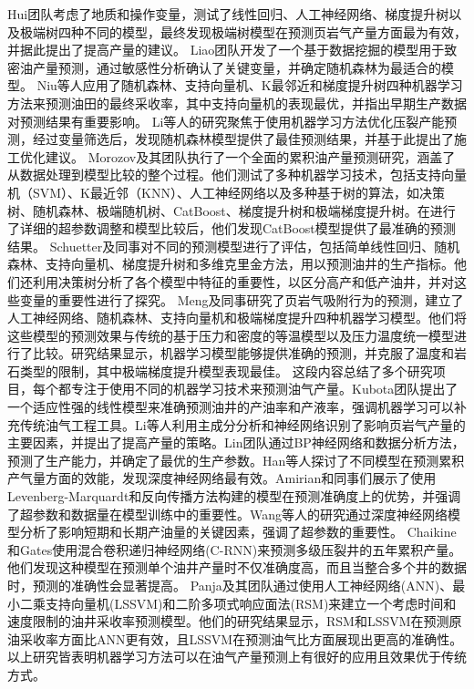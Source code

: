 Hui团队考虑了地质和操作变量，测试了线性回归、人工神经网络、梯度提升树以及极端树四种不同的模型，最终发现极端树模型在预测页岩气产量方面最为有效，并据此提出了提高产量的建议。
Liao团队开发了一个基于数据挖掘的模型用于致密油产量预测，通过敏感性分析确认了关键变量，并确定随机森林为最适合的模型。
Niu等人应用了随机森林、支持向量机、K最邻近和梯度提升树四种机器学习方法来预测油田的最终采收率，其中支持向量机的表现最优，并指出早期生产数据对预测结果有重要影响。
Li等人的研究聚焦于使用机器学习方法优化压裂产能预测，经过变量筛选后，发现随机森林模型提供了最佳预测结果，并基于此提出了施工优化建议。
Morozov及其团队执行了一个全面的累积油产量预测研究，涵盖了从数据处理到模型比较的整个过程。他们测试了多种机器学习技术，包括支持向量机（SVM）、K最近邻（KNN）、人工神经网络以及多种基于树的算法，如决策树、随机森林、极端随机树、CatBoost、梯度提升树和极端梯度提升树。在进行了详细的超参数调整和模型比较后，他们发现CatBoost模型提供了最准确的预测结果。
Schuetter及同事对不同的预测模型进行了评估，包括简单线性回归、随机森林、支持向量机、梯度提升树和多维克里金方法，用以预测油井的生产指标。他们还利用决策树分析了各个模型中特征的重要性，以区分高产和低产油井，并对这些变量的重要性进行了探究。
Meng及同事研究了页岩气吸附行为的预测，建立了人工神经网络、随机森林、支持向量机和极端梯度提升四种机器学习模型。他们将这些模型的预测效果与传统的基于压力和密度的等温模型以及压力温度统一模型进行了比较。研究结果显示，机器学习模型能够提供准确的预测，并克服了温度和岩石类型的限制，其中极端梯度提升模型表现最佳。
这段内容总结了多个研究项目，每个都专注于使用不同的机器学习技术来预测油气产量。Kubota团队提出了一个适应性强的线性模型来准确预测油井的产油率和产液率，强调机器学习可以补充传统油气工程工具。Li等人利用主成分分析和神经网络识别了影响页岩气产量的主要因素，并提出了提高产量的策略。Lin团队通过BP神经网络和数据分析方法，预测了生产能力，并确定了最优的生产参数。Han等人探讨了不同模型在预测累积产气量方面的效能，发现深度神经网络最有效。Amirian和同事们展示了使用Levenberg-Marquardt和反向传播方法构建的模型在预测准确度上的优势，并强调了超参数和数据量在模型训练中的重要性。Wang等人的研究通过深度神经网络模型分析了影响短期和长期产油量的关键因素，强调了超参数的重要性。
Chaikine和Gates使用混合卷积递归神经网络(C-RNN)来预测多级压裂井的五年累积产量。他们发现这种模型在预测单个油井产量时不仅准确度高，而且当整合多个井的数据时，预测的准确性会显著提高。
Panja及其团队通过使用人工神经网络(ANN)、最小二乘支持向量机(LSSVM)和二阶多项式响应面法(RSM)来建立一个考虑时间和速度限制的油井采收率预测模型。他们的研究结果显示，RSM和LSSVM在预测原油采收率方面比ANN更有效，且LSSVM在预测油气比方面展现出更高的准确性。
以上研究皆表明机器学习方法可以在油气产量预测上有很好的应用且效果优于传统方式。
